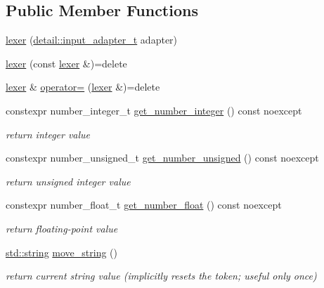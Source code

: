 \subsection*{Public Member Functions}
\begin{DoxyCompactItemize}
\item 
\hyperlink{classnlohmann_1_1detail_1_1lexer_a0d7de7b99bc839ea9a39dd738d05d89c}{lexer} (\hyperlink{namespacenlohmann_1_1detail_ae132f8cd5bb24c5e9b40ad0eafedf1c2}{detail\+::input\+\_\+adapter\+\_\+t} adapter)
\item 
\hyperlink{classnlohmann_1_1detail_1_1lexer_a2e8ce2a0d266d148b69dfbcc2e4ad71a}{lexer} (const \hyperlink{classnlohmann_1_1detail_1_1lexer}{lexer} \&)=delete
\item 
\hyperlink{classnlohmann_1_1detail_1_1lexer}{lexer} \& \hyperlink{classnlohmann_1_1detail_1_1lexer_a33e97dee7c5faf1b36aff5b74a6c8f55}{operator=} (\hyperlink{classnlohmann_1_1detail_1_1lexer}{lexer} \&)=delete
\item 
constexpr number\+\_\+integer\+\_\+t \hyperlink{classnlohmann_1_1detail_1_1lexer_afa338d17c0a7e834c73104258a2c8ced}{get\+\_\+number\+\_\+integer} () const noexcept
\begin{DoxyCompactList}\small\item\em return integer value \end{DoxyCompactList}\item 
constexpr number\+\_\+unsigned\+\_\+t \hyperlink{classnlohmann_1_1detail_1_1lexer_a56640fb92293e0c17742ca3c814d74d6}{get\+\_\+number\+\_\+unsigned} () const noexcept
\begin{DoxyCompactList}\small\item\em return unsigned integer value \end{DoxyCompactList}\item 
constexpr number\+\_\+float\+\_\+t \hyperlink{classnlohmann_1_1detail_1_1lexer_ac013af35a21e9387993b19da5b3e0ae2}{get\+\_\+number\+\_\+float} () const noexcept
\begin{DoxyCompactList}\small\item\em return floating-\/point value \end{DoxyCompactList}\item 
\hyperlink{namespacenlohmann_1_1detail_a90aa5ef615aa8305e9ea20d8a947980fab45cffe084dd3d20d928bee85e7b0f21}{std\+::string} \hyperlink{classnlohmann_1_1detail_1_1lexer_a73216fe28e91a0aa3bdae77a89ce554b}{move\+\_\+string} ()
\begin{DoxyCompactList}\small\item\em return current string value (implicitly resets the token; useful only once) \end{DoxyCompactList}\item 

\end{DoxyCompactItemize}
